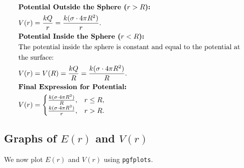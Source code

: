 \documentclass[12pt]{article}
\begin{document}
\begin{correctionbox}
	\begin{align*}
		 & \textbf{Potential Outside the Sphere ($ r > R $):}                                \\
		 & V(r) = \frac{k Q}{r} = \frac{k (\sigma \cdot 4 \pi R^2)}{r}.
		\\
		 & \textbf{Potential Inside the Sphere ($ r < R $):}                                 \\
		 & \text{The potential inside the sphere is constant and equal to the potential at } \\
		 & \text{the surface:}                                                               \\
		 & V(r) = V(R) = \frac{k Q}{R} = \frac{k (\sigma \cdot 4 \pi R^2)}{R}.
		\\
		 & \textbf{Final Expression for Potential:}                                          \\
		 & V(r) =
		\begin{cases}
			\frac{k (\sigma \cdot 4 \pi R^2)}{R}, & r \leq R, \\
			\frac{k (\sigma \cdot 4 \pi R^2)}{r}, & r > R.
		\end{cases}
	\end{align*}
	\subsection*{Graphs of $ E(r) $ and $ V(r) $}
	We now plot $ E(r) $ and $ V(r) $ using \texttt{pgfplots}.

	\begin{center}
	\end{center}


\end{correctionbox}
\end{document}
